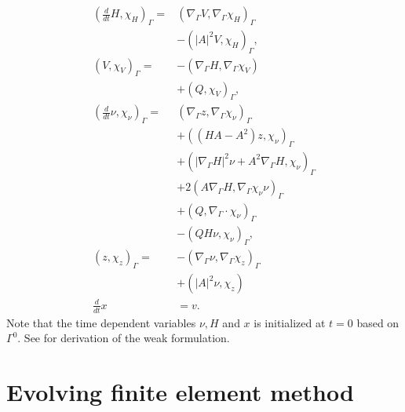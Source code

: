\begin{subequations}
\begin{align}
\label{eq:WE_weak_form}
\left( \frac{d}{dt}H, \chi _{H} \right)_{\Gamma } =&  \left( \nabla _{\Gamma } V, \nabla _{\Gamma }\chi _{H} \right) _{\Gamma } \nonumber \\
                                                   &- \left( \left\lvert A \right\rvert ^2 V, \chi _{H} \right) _{\Gamma },   \\
\left( V, \chi _{V} \right)_{\Gamma } =& -\left( \nabla _{\Gamma } H, \nabla _{\Gamma } \chi _{V} \right) \nonumber \\
 & + \left( Q, \chi _{V} \right)_{\Gamma },   \\
\left( \frac{d}{dt} \nu , \chi _{\nu } \right)_{\Gamma } =& \left( \nabla _{\Gamma }z, \nabla _{\Gamma } \chi _{\nu } \right) _{\Gamma }\nonumber   \\
 & + \left( ( HA - A^2  )z,\chi_\nu  \right)_{\Gamma }   \nonumber \\
 & + \left( \left\lvert \nabla _{\Gamma } H \right\rvert^2 \nu + A^2\nabla _{\Gamma } H, \chi _{\nu }  \right)_{\Gamma} \nonumber  \\
 & + 2 \left( A \nabla _{\Gamma } H, \nabla _{\Gamma } \chi _{\nu } \nu  \right)_{\Gamma} \nonumber    \\
 &  + \left( Q, \nabla _{\Gamma } \cdot \chi _{\nu }  \right)_{\Gamma } \nonumber  \\
  &- \left( QH\nu , \chi _{\nu } \right) _{\Gamma},\\
\left( z, \chi _{z} \right) _{\Gamma }  =& - \left( \nabla _{\Gamma } \nu , \nabla _{\Gamma } \chi _{z} \right)_{\Gamma} \nonumber \\
 & + \left( \left\lvert A \right\rvert ^2 \nu , \chi _{z} \right) \\
\frac{d}{dt}x &= v
.\end{align}
\end{subequations}
Note that the time dependent variables $\nu, H $ and $x$ is initialized at $t=0$  based on $\Gamma ^{0}$. See \cite{kovacs2021convergent} for derivation of the weak formulation.

\newpage
\section{Evolving finite element method}%
\label{sec:evolving_finite_element_method}












